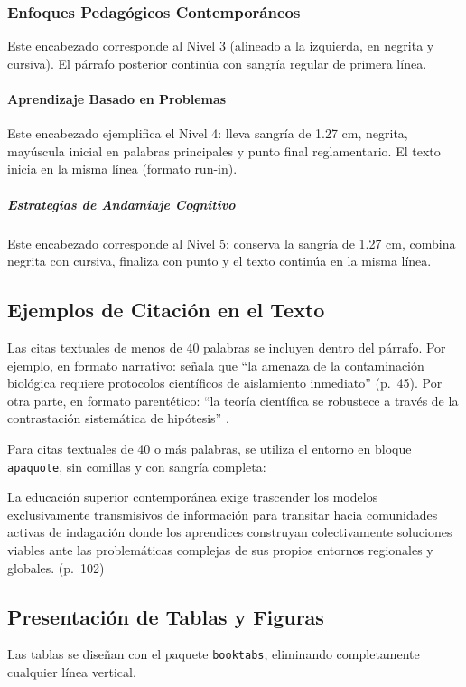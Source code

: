 \documentclass[12pt,letterpaper]{article}
\newenvironment{apaquote}
  {\list{}{\leftmargin=1.27cm\rightmargin=0pt\parsep=0pt\setstretch{1.5}}\item\relax}
  {\endlist}
\begin{document}
\subsubsection{Enfoques Pedagógicos Contemporáneos}
Este encabezado corresponde al Nivel 3 (alineado a la izquierda, en negrita y cursiva). El párrafo posterior continúa con sangría regular de primera línea.

\paragraph{Aprendizaje Basado en Problemas} Este encabezado ejemplifica el Nivel 4: lleva sangría de 1.27 cm, negrita, mayúscula inicial en palabras principales y punto final reglamentario. El texto inicia en la misma línea (formato run-in).

\subparagraph{Estrategias de Andamiaje Cognitivo} Este encabezado corresponde al Nivel 5: conserva la sangría de 1.27 cm, combina negrita con cursiva, finaliza con punto y el texto continúa en la misma línea.

\subsection{Ejemplos de Citación en el Texto}
Las citas textuales de menos de 40 palabras se incluyen dentro del párrafo. Por ejemplo, en formato narrativo: \textcite{crichton1969} señala que \enquote{la amenaza de la contaminación biológica requiere protocolos científicos de aislamiento inmediato} (p.~45). Por otra parte, en formato parentético: \enquote{la teoría científica se robustece a través de la contrastación sistemática de hipótesis} \parencite[p.~78]{ocana2020}.

Para citas textuales de 40 o más palabras, se utiliza el entorno en bloque \texttt{apaquote}, sin comillas y con sangría completa:

\begin{apaquote}
La educación superior contemporánea exige trascender los modelos exclusivamente transmisivos de información para transitar hacia comunidades activas de indagación donde los aprendices construyan colectivamente soluciones viables ante las problemáticas complejas de sus propios entornos regionales y globales. (p.~102)
\end{apaquote}

\subsection{Presentación de Tablas y Figuras}
Las tablas se diseñan con el paquete \texttt{booktabs}, eliminando completamente cualquier línea vertical.
\end{document}
